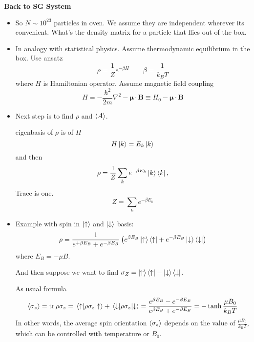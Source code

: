 \documentclass[11pt, a4paper]{article}
\renewcommand{\laplacian}{\nabla^{2}}
\newcommand{\Ham}{Hamiltonian\xspace}
\renewcommand{\vec}[1]{\bm{#1}}  %
\newcommand{\ua}{\uparrow}  %
\newcommand{\da}{\downarrow}  %
\newcommand{\B}{\vec{B}}  %
\newcommand{\m}{\vec{\mu}}  %
\begin{document}
\textbf{Back to SG System}
\begin{itemize}
    \item So $ N \sim 10^{23} $ particles in oven. We assume they are independent wherever its convenient. What's the density matrix for a particle that flies out of the box. 

    \item In analogy with statistical physics. Assume thermodynamic equilibrium in the box. Use ansatz
    \begin{equation*}
        \rho = \frac{1}{Z} e^{-\beta H} \qquad \beta = \frac{1}{k_{B}T}
    \end{equation*}
    where $ H $ is \Ham operator. Assume magnetic field coupling
    \begin{equation*}
        H = - \frac{\hbar^{2}}{2m}\laplacian - \m \cdot \B \equiv H_{0} - \m \cdot \B
    \end{equation*}

    \item Next step is to find $ \rho $ and $ \ev{A} $.

    eigenbasis of $ \rho $ is of $ H $
    \begin{equation*}
        H \ket{k} = E_{k}\ket{k}
    \end{equation*}
    and then
    \begin{equation*}
        \rho = \frac{1}{Z} \sum_{k} e^{-\beta E_{k}} \ket{k}\bra{k}, 
    \end{equation*}
    Trace is one. 
    \begin{equation*}
        Z = \sum_{k} e^{-\beta E_{k}}
    \end{equation*}


    \item Example with spin in $ \ket{\ua} $ and $ \ket{\da} $ basis:
    \begin{equation*}
        \rho = \frac{1}{e^{+\beta E_{B}} + e^{-\beta E_{B}}} \left( e^{\beta E_{B}} \ket{\ua} \bra{\ua} + e^{-\beta E_{B}} \ket{\da}\bra{\da} \right)
    \end{equation*}
    where $ E_{B} = - \mu B $.

    And then suppose we want to find $ \sigma_{Z} = \ket{\ua} \bra{\ua} - \ket{\da} \bra{\da}  $.

    As usual formula
    \begin{equation*}
        \ev{\sigma_{z}} = \tr \rho \sigma_{z} = \mel{\ua}{\rho\sigma_{z}}{\ua} + \mel{\da}{\rho \sigma_{z}}{\da} = \frac{e^{\beta E_{B}} - e^{-\beta E_{B}}}{e^{\beta E_{B}} + e^{-\beta E_{B}}} = - \tanh \frac{\mu B_{0}}{k_{B} T}
    \end{equation*}
    In other words, the average spin orientation $ \ev{\sigma_{z}} $ depends on the value of $ \frac{\mu B_{0}}{k_{B} T} $, which can be controlled with temperature or $ B_{0} $.
    
\end{itemize}
\end{document}
